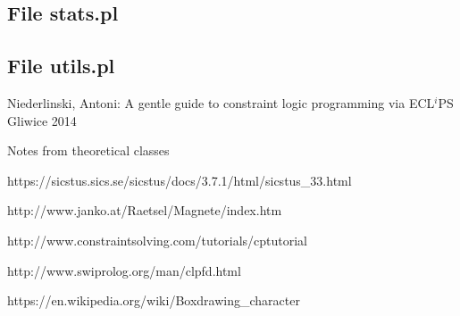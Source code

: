 \documentclass{llncs}
\begin{document}
\subsection{File stats.pl}


\subsection{File utils.pl}



\begin{thebibliography}{}

Niederlinski, Antoni:
A gentle guide to constraint logic programming
via ECL$^i$PS
Gliwice 2014

Notes from theoretical classes

https://sicstus.sics.se/sicstus/docs/3.7.1/html/sicstus\_33.html

http://www.janko.at/Raetsel/Magnete/index.htm

http://www.constraintsolving.com/tutorials/cp\-tutorial

http://www.swi\-prolog.org/man/clpfd.html

https://en.wikipedia.org/wiki/Box\-drawing\_character

\end{thebibliography}
\end{document}
